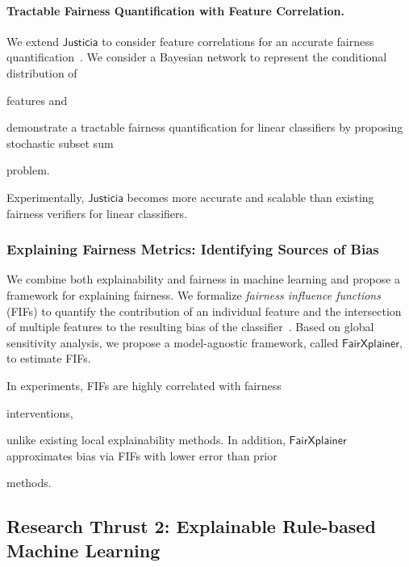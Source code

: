 \documentclass[10pt]{article}
\newif\iflongproposal
\begin{document}
	
	\paragraph{Tractable Fairness Quantification with Feature Correlation.} We extend $\mathsf{Justicia}$ to consider feature correlations for an accurate fairness quantification~\cite{ghosh2022algorithmic}. We consider a Bayesian network to represent the conditional distribution of 
	\iflongproposal
	features\textemdash the SSAT formula grows with the complexity of the Bayesian network, calling for a more scalable solution.	Therefore, we
	\else
	features and
	\fi
	demonstrate a tractable fairness quantification for linear classifiers by proposing stochastic subset sum 
	\iflongproposal
	problem, which admits an efficient dynamic programming solution with pseudo-polynomial complexity.
	\else
	problem.
	\fi 
	Experimentally, $\mathsf{Justicia}$ becomes more accurate and scalable than existing fairness verifiers for linear classifiers.
	
	
	
	
	
	\subsubsection*{Explaining Fairness Metrics: Identifying Sources of Bias}
	We combine both explainability and fairness in machine learning and propose a framework for explaining fairness.  We formalize \textit{fairness influence functions} (FIFs) to quantify the contribution of an individual feature and the intersection of multiple features to the resulting bias of the classifier~\cite{ghosh2022how}. 	Based on global sensitivity analysis, we propose a model-agnostic framework, called $\mathsf{FairXplainer}$, to estimate FIFs. 
	\iflongproposal
	The key idea is to represent fairness metrics using the variance of predictions and apply variance decomposition to compute FIFs.
	\fi
	In experiments, FIFs are highly correlated with fairness  
	\iflongproposal
	interventions and demonstrate a higher granular explanation of unfairness through intersectional influences,
	\else 
	interventions, 
	\fi
	unlike existing local explainability methods. In addition, $\mathsf{FairXplainer}$ approximates bias via FIFs with lower error than prior 
	\iflongproposal
	methods across classifiers such as neural networks and SVMs.
	\else
	methods.
	\fi
	
	

		
	
	\subsection*{Research Thrust 2: Explainable Rule-based Machine Learning}
\end{document}
